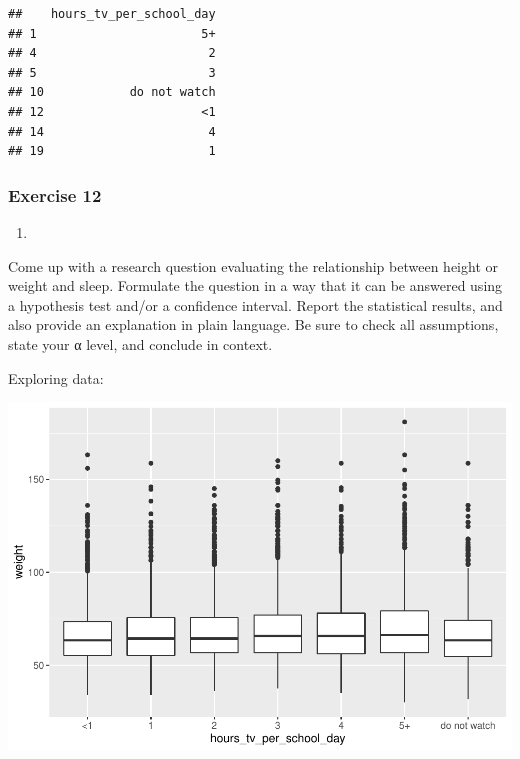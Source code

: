 \documentclass[
]{article}
\newenvironment{Shaded}{\begin{snugshade}}{\end{snugshade}}
\newcommand{\DataTypeTok}[1]{\textcolor[rgb]{0.13,0.29,0.53}{#1}}
\newcommand{\KeywordTok}[1]{\textcolor[rgb]{0.13,0.29,0.53}{\textbf{#1}}}
\newcommand{\NormalTok}[1]{#1}
\newcommand{\OperatorTok}[1]{\textcolor[rgb]{0.81,0.36,0.00}{\textbf{#1}}}
\newcommand{\StringTok}[1]{\textcolor[rgb]{0.31,0.60,0.02}{#1}}
\begin{document}
\begin{verbatim}
##    hours_tv_per_school_day
## 1                       5+
## 4                        2
## 5                        3
## 10            do not watch
## 12                      <1
## 14                       4
## 19                       1
\end{verbatim}

\hypertarget{exercise-12}{%
\subsubsection{Exercise 12}\label{exercise-12}}

\begin{enumerate}
\def\labelenumi{\arabic{enumi}.}
\item
\end{enumerate}

Come up with a research question evaluating the relationship between
height or weight and sleep. Formulate the question in a way that it can
be answered using a hypothesis test and/or a confidence interval. Report
the statistical results, and also provide an explanation in plain
language. Be sure to check all assumptions, state your α level, and
conclude in context.

Exploring data:

\begin{Shaded}
\end{Shaded}

\includegraphics{lab-7_files/figure-latex/unnamed-chunk-19-1.pdf}
\end{document}
